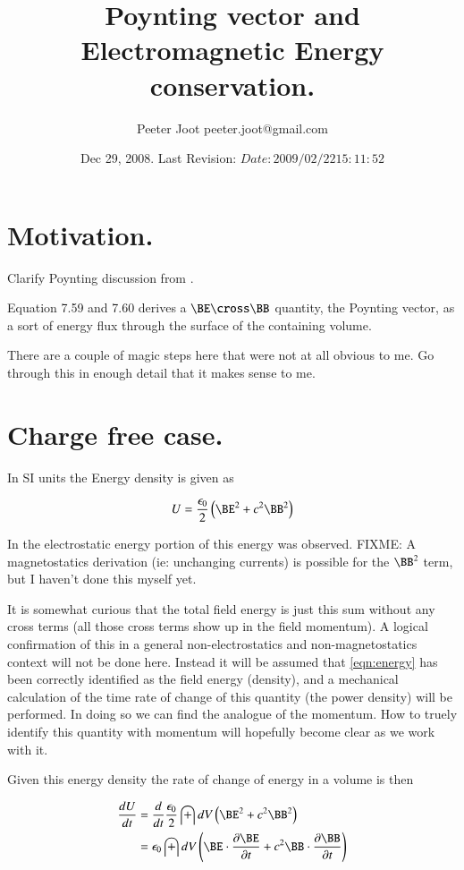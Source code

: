 \documentclass{article}
\title{ Poynting vector and Electromagnetic Energy conservation. }
\author{Peeter Joot \quad peeter.joot@gmail.com}
\date{ Dec 29, 2008.  Last Revision: $Date: 2009/02/22 15:11:52 $ }
\begin{document}
\maketitle{}

\tableofcontents

\section{ Motivation. }

Clarify Poynting discussion from \cite{doran2003gap}.

Equation 7.59 and 7.60 derives a $\BE \cross \BB$ quantity, the Poynting vector, as a sort of energy flux through the surface of the containing volume.

There are a couple of magic steps here that were not at all obvious to me.  Go through this in enough detail that it makes sense to me.

\section{ Charge free case. }

In SI units the Energy density is given as

\begin{align}\label{eqn:energy}
U = \frac{\epsilon_0}{2}\left( \BE^2 + c^2 \BB^2 \right)
\end{align}

In \cite{PJelectricFieldEnergy} the electrostatic energy portion of this
energy was observed.
FIXME: A magnetostatics derivation (ie: unchanging currents)
is possible for the $\BB^2$ term, but I haven't done this myself yet.

It is somewhat curious that the total field energy is just this 
sum without any cross terms (all those cross terms show up in the
field momentum).  A logical confirmation of this in a general
non-electrostatics and non-magnetostatics context will not be done here.
Instead it will be assumed that \ref{eqn:energy} has been correctly identified
as the field energy (density), and a mechanical calculation of the time 
rate of change of this
quantity (the power density) will be performed.  In doing so we can find the
analogue of the momentum.  How to truely identify this quantity with momentum
will hopefully become clear as we work with it.

Given this energy density the rate of change of energy in a volume is then

\begin{align*}
\frac{dU}{dt} 
&= 
\frac{d}{dt} 
\frac{\epsilon_0}{2} \int dV \left( \BE^2 + c^2 \BB^2 \right) \\
&= 
\epsilon_0 \int dV \left( \BE \cdot \PD{t}{\BE} + c^2 \BB \cdot \PD{t}{\BB} \right) \\
\end{align*}
\end{document}
